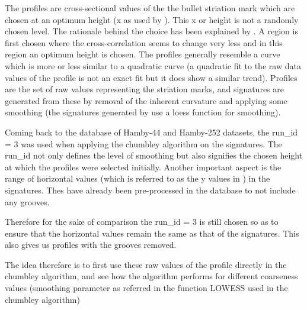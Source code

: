 \documentclass[12pt]{article}
\begin{document}
The profiles are cross-sectional values of the the bullet striation mark
which are chosen at an optimum height (x as used by \citet{aoas}). This
x or height is not a randomly chosen level. The rationale behind the
choice has been explained by \citet{aoas}. A region is first chosen
where the cross-correlation seems to change very less and in this region
an optimum height is chosen. The profiles generally resemble a curve
which is more or less similar to a quadratic curve (a quadratic fit to
the raw data values of the profile is not an exact fit but it does show
a similar trend). Profiles are the set of raw values representing the
striation marks, and signatures are generated from these by removal of
the inherent curvature and applying some smoothing (the signatures
generated by \citet{aoas} use a loess function for smoothing).

Coming back to the database of Hamby-44 and Hamby-252 datasets, the
run\_id = 3 was used when applying the chumbley algorithm on the
signatures. The run\_id not only defines the level of smoothing but also
signifies the chosen height at which the profiles were selected
initially. Another important aspect is the range of horizontal values
(which is referred to as the y values in \citet{aoas}) in the
signatures. Thes have already been pre-processed in the database to not
include any grooves.

Therefore for the sake of comparison the run\_id = 3 is still chosen so
as to ensure that the horizontal values remain the same as that of the
signatures. This also gives us profiles with the grooves removed.

The idea therefore is to first use these raw values of the profile
directly in the chumbley algorithm, and see how the algorithm performs
for different coarseness values (smoothing parameter as referred in the
function LOWESS used in the chumbley algorithm)
\end{document}
